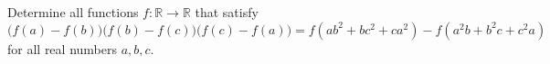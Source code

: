 Determine all functions $f : \mathbb{R} \to \mathbb{R}$ that satisfy
\[ \bigl(f(a)-f(b)\bigr)\bigl(f(b)-f(c)\bigr)\bigl(f(c)-f(a)\bigr) = f(ab^2+bc^2+ca^2) - f(a^2b+b^2c+c^2a) \]
for all real numbers $a,b,c$.
